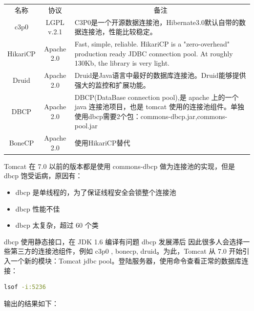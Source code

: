 \documentclass[letter]{book}
\begin{document}
\begin{tabular}{|c|c|p{7cm}|}
	\hline
	\multirow{1}{*}{名称}
	& \multicolumn{1}{c|}{协议} 
	& \multicolumn{1}{c|}{备注}\\			
	\cline{1-3}
	c3p0 &  LGPL v.2.1  & C3P0是一个开源数据连接池，Hibernate3.0默认自带的数据连接池，性能比较稳定。\\
	\hline
	HikariCP & Apache 2.0 & Fast, simple, reliable. HikariCP is a "zero-overhead" production ready JDBC connection pool. At roughly 130Kb, the library is very light. \\
	\hline
	Druid & Apache 2.0 & Druid是Java语言中最好的数据库连接池。Druid能够提供强大的监控和扩展功能。 \\
	\hline
	DBCP & Apache 2.0 & DBCP(DataBase connection pool),是 apache 上的一个 java 连接池项目，也是 tomcat 使用的连接池组件。单独使用dbcp需要2个包：commons-dbcp.jar,commons-pool.jar \\
	\hline
	BoneCP & Apache 2.0 & 使用HikariCP替代\\
	\hline
\end{tabular}

Tomcat 在 7.0 以前的版本都是使用 commons-dbcp 做为连接池的实现，但是 dbcp 饱受诟病，原因有：

\begin{itemize}
	\item{dbcp 是单线程的，为了保证线程安全会锁整个连接池}
	\item{dbcp 性能不佳}
	\item{dbcp 太复杂，超过 60 个类}
\end{itemize}

dbcp 使用静态接口，在 JDK 1.6 编译有问题
dbcp 发展滞后
因此很多人会选择一些第三方的连接池组件，例如 c3p0 , bonecp, druid。为此，Tomcat 从 7.0 开始引入一个新的模块：Tomcat jdbc pool。登陆服务器，使用命令查看正常的数据库连接：

\begin{lstlisting}[language=Bash]
lsof -i:5236
\end{lstlisting}

输出的结果如下：
\end{document}
